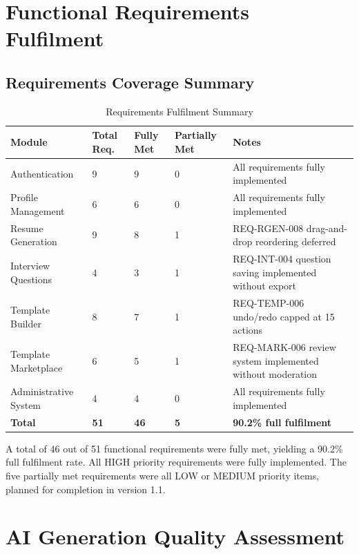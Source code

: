 \documentclass[12pt, a4paper, oneside]{report}
\begin{document}
\section{Functional Requirements Fulfilment}

\subsection{Requirements Coverage Summary}

\begin{table}[H]
\centering
\caption{Requirements Fulfilment Summary}
\label{tab:req_fulfilment}
\renewcommand{\arraystretch}{1.4}
\begin{tabularx}{\textwidth}{|p{4cm}|p{1.8cm}|p{1.8cm}|p{1.8cm}|X|}
\hline
\textbf{Module} & \textbf{Total Req.} & \textbf{Fully Met} & \textbf{Partially Met} & \textbf{Notes} \\
\hline
Authentication & 9 & 9 & 0 & All requirements fully implemented \\
\hline
Profile Management & 6 & 6 & 0 & All requirements fully implemented \\
\hline
Resume Generation & 9 & 8 & 1 & REQ-RGEN-008 drag-and-drop reordering deferred \\
\hline
Interview Questions & 4 & 3 & 1 & REQ-INT-004 question saving implemented without export \\
\hline
Template Builder & 8 & 7 & 1 & REQ-TEMP-006 undo/redo capped at 15 actions \\
\hline
Template Marketplace & 6 & 5 & 1 & REQ-MARK-006 review system implemented without moderation \\
\hline
Administrative System & 4 & 4 & 0 & All requirements fully implemented \\
\hline
\hline
\textbf{Total} & \textbf{51} & \textbf{46} & \textbf{5} & \textbf{90.2\% full fulfilment} \\
\hline
\end{tabularx}
\end{table}

A total of 46 out of 51 functional requirements were fully met, yielding a 90.2\% full fulfilment rate. All HIGH priority requirements were fully implemented. The five partially met requirements were all LOW or MEDIUM priority items, planned for completion in version 1.1.

\section{AI Generation Quality Assessment}
\end{document}
